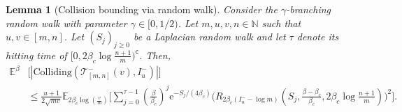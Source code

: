 \documentclass[a4paper, a4wide, 10pt, reqno]{amsart}
\theoremstyle{plain}
\newtheorem{lemma}[theorem]{Lemma}
\theoremstyle{definition}
\numberwithin{equation}{section}
\newcommand{\N}{{\mathbb N}}
\newcommand{\E}{\mathbb E}
\newcommand{\sT}{{\mathscr T}}
\newcommand{\re}{{\mathrm e}}
\renewcommand{\complement}{\mathsf{c}}
\begin{document}
\begin{lemma}[Collision bounding via random walk]\label{lem:fake}
    Consider the $\gamma$-branching random walk with parameter $\gamma\in[0,1/2)$. Let $m,u, v, n\in\N$ such that $u, v\in[m,n]$. Let $(S_j)_{j\ge 0}$ be a Laplacian random walk and let $\tau$ denote its hitting time of  $[0,2\beta_c\log\tfrac{n+1}{m})^\complement$. Then, 
    \begin{equation}\label{eq:lem-fake}
    \begin{aligned}
    \E^{\beta}&\big[|\mathrm{Colliding}(\sT_{[m,n]}^-(v), I_u^-)|\big] \\&\le\frac{u+1}{2\sqrt{mv}}\E_{2\beta_c\log (\tfrac{v}{m})}\Bigg[\sum_{j=0}^{\tau-1}(\tfrac\beta{\beta_c})^j \re^{-S_j/(4\beta_c)}\big(R_{2\beta_c(I_u^--\log m)}(S_j,\tfrac{\beta-\beta_c}{\beta_c}, 2\beta_c\log \tfrac{n+1}{m})\big)^2\Bigg].
    \end{aligned}
    \end{equation}
\end{lemma}
\end{document}
